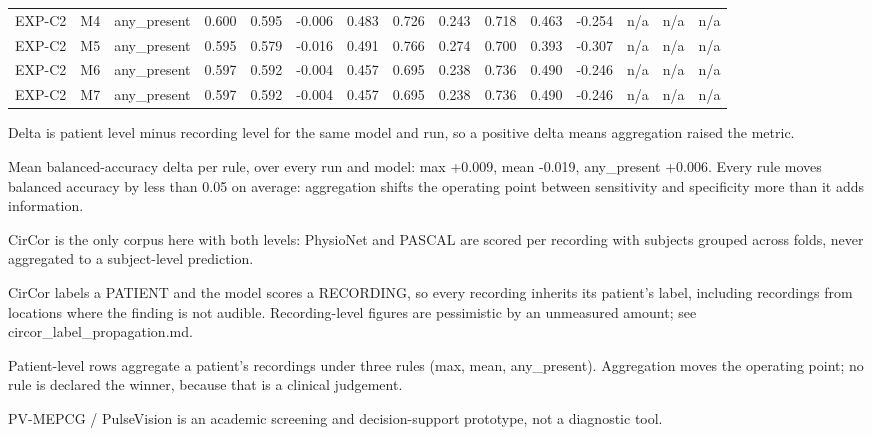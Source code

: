 \begin{table}[htbp]
\begin{tabular}{lrrrrrrrrrrrrrr}
    EXP-C2 & M4 & any\_present & 0.600 & 0.595 & -0.006 & 0.483 & 0.726 & 0.243 & 0.718 & 0.463 & -0.254 & n/a & n/a & n/a \\
    EXP-C2 & M5 & any\_present & 0.595 & 0.579 & -0.016 & 0.491 & 0.766 & 0.274 & 0.700 & 0.393 & -0.307 & n/a & n/a & n/a \\
    EXP-C2 & M6 & any\_present & 0.597 & 0.592 & -0.004 & 0.457 & 0.695 & 0.238 & 0.736 & 0.490 & -0.246 & n/a & n/a & n/a \\
    EXP-C2 & M7 & any\_present & 0.597 & 0.592 & -0.004 & 0.457 & 0.695 & 0.238 & 0.736 & 0.490 & -0.246 & n/a & n/a & n/a \\
    \bottomrule
  \end{tabular}
  \par\footnotesize Delta is patient level minus recording level for the same model and run, so a positive delta means aggregation raised the metric.
  \par\footnotesize Mean balanced-accuracy delta per rule, over every run and model: max +0.009, mean -0.019, any\_present +0.006. Every rule moves balanced accuracy by less than 0.05 on average: aggregation shifts the operating point between sensitivity and specificity more than it adds information.
  \par\footnotesize CirCor is the only corpus here with both levels: PhysioNet and PASCAL are scored per recording with subjects grouped across folds, never aggregated to a subject-level prediction.
  \par\footnotesize CirCor labels a PATIENT and the model scores a RECORDING, so every recording inherits its patient's label, including recordings from locations where the finding is not audible. Recording-level figures are pessimistic by an unmeasured amount; see circor\_label\_propagation.md.
  \par\footnotesize Patient-level rows aggregate a patient's recordings under three rules (max, mean, any\_present). Aggregation moves the operating point; no rule is declared the winner, because that is a clinical judgement.
  \par\footnotesize PV-MEPCG / PulseVision is an academic screening and decision-support prototype, not a diagnostic tool.
\end{table}
